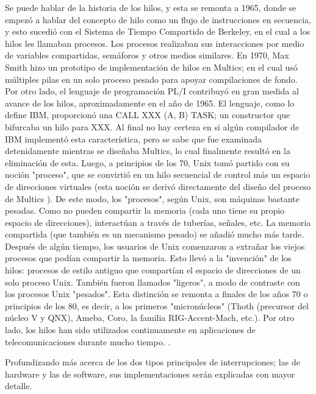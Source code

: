 \documentclass[12pt]{article}
\begin{document}
{Se puede hablar de la historia de los hilos, y esta se remonta a 1965, donde se empezó a hablar del concepto de hilo como un flujo de instrucciones en secuencia, y esto sucedió con el Sistema de Tiempo Compartido de Berkeley, en el cual a los hilos les llamaban procesos.
Los procesos realizaban sus interacciones por medio de variables compartidas, semáforos y otros medios similares. En 1970, Max Smith hizo un prototipo de implementación de hilos en Multics; en el cual usó múltiples pilas en un solo proceso pesado para apoyar compilaciones de fondo.
Por otro lado, el lenguaje de programación PL/I contribuyó en gran medida al avance de los hilos, aproximadamente en el año de 1965. El lenguaje, como lo define IBM, proporcionó una CALL XXX (A, B) TASK; un constructor que bifurcaba un hilo para XXX. Al final no hay certeza en si algún compilador de IBM implementó esta característica, pero se sabe que fue examinada detenidamente mientras se diseñaba Multics, lo cual finalmente resultó en la eliminación de esta.
Luego, a principios de los 70, Unix tomó partido con su noción "proceso", que se convirtió en un hilo secuencial de control más un espacio de direcciones virtuales (esta noción se derivó directamente del diseño del proceso de Multics ). De este modo, los "procesos", según Unix, son máquinas bastante pesadas. Como no pueden compartir la memoria (cada uno tiene su propio espacio de direcciones), interactúan a través de tuberías, señales, etc. La memoria compartida (que también es un mecanismo pesado) se añadió mucho más tarde.
Después de algún tiempo, los usuarios de Unix comenzaron a extrañar los viejos procesos que podían compartir la memoria. Esto llevó a la "invención" de los hilos: procesos de estilo antiguo que compartían el espacio de direcciones de un solo proceso Unix. También fueron llamados "ligeros", a modo de contraste con los procesos Unix "pesados". Esta distinción se remonta a finales de los años 70 o principios de los 80, es decir, a los primeros "micronúcleos" (Thoth (precursor del núcleo V y QNX), Ameba, Coro, la familia RIG-Accent-Mach, etc.).
Por otro lado, los hilos han sido utilizados continuamente en aplicaciones de telecomunicaciones durante mucho tiempo.
\citep{Tip}.
\newline

Profundizando más acerca de los dos tipos principales de interrupciones; las de hardware y las de software, sus implementaciones serán explicadas con mayor detalle. 
\newline

}
\end{document}
